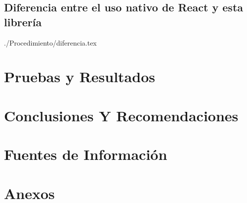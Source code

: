 \documentclass[a4paper,12pt, listof=totoc]{report}
\begin{document}
			\section {Diferencia entre el uso nativo de React y esta librería}
				 {./Procedimiento/diferencia.tex}
			
		
		\chapter {Pruebas y Resultados}
			
		
		\chapter {Conclusiones Y Recomendaciones}
			
		
		\chapter {Fuentes de Información}
			
			
		\chapter {Anexos}
		

\end{document}
